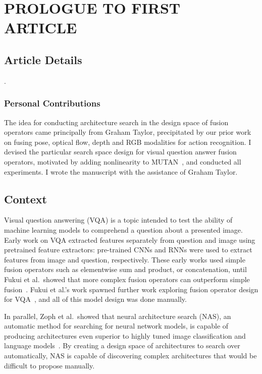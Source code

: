 \chapter{PROLOGUE TO FIRST ARTICLE}


\section{Article Details}

.

\subsection{Personal Contributions}

The idea for conducting architecture search in the design space of fusion
operators came principally from Graham Taylor, precipitated by our prior work
on fusing pose, optical flow, depth and RGB modalities for action recognition.
I devised the particular search space design for visual question answer fusion
operators, motivated by adding nonlinearity to MUTAN~\citep{ben2017mutan}, and
conducted all experiments.
I wrote the manuscript with the assistance of Graham Taylor.


\section{Context}

Visual question answering (VQA) is a topic intended to test the ability of
machine learning models to comprehend a question about a presented image.
Early work on VQA extracted features separately from question and image using
pretrained feature extractors: pre-trained CNNs and RNNs were used to extract
features from image and question, respectively.
These early works used simple fusion operators such as elementwise sum and
product, or concatenation, until Fukui et al.\ showed that more complex fusion
operators can outperform simple fusion~\citep{fukui2016multimodalCB}.
Fukui et al.'s work spawned further work exploring fusion operator design for
VQA~\citep{Kim2017, ben2017mutan}, and all of this model design was done
manually.

In parallel, Zoph et al.\ showed that neural architecture
search (NAS), an automatic method for searching for neural network models, is
capable of producing architectures even superior to highly tuned image
classification and language models~\citep{zoph2016neural}.
By creating a design space of architectures to search over automatically, NAS
is capable of discovering complex architectures that would be difficult to
propose manually.

